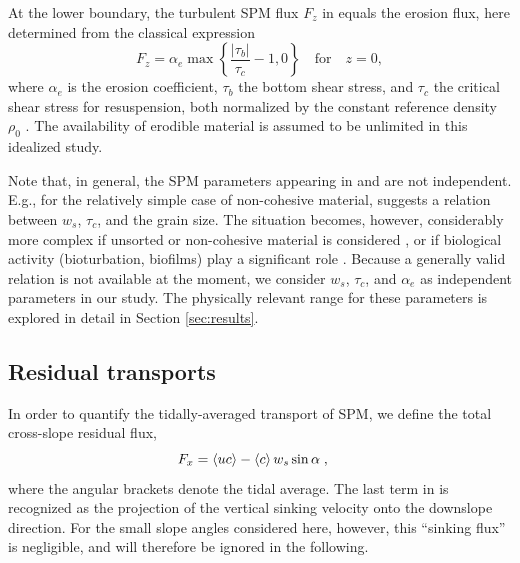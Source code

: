 At the lower boundary, the turbulent SPM flux $F_z$ in  equals
the erosion flux, here determined from the classical expression
\begin{equation}
  \label{defFz}
  F_z = \alpha_e \max \left\{ \frac{\left| \tau_b \right| }{\tau_c} -1 , 0 \right\}
  \quad \text{for} \quad z=0,
\end{equation}
where $\alpha_e$ is the erosion coefficient, $\tau_b$ the
bottom shear stress, and $\tau_c$ the critical shear stress for
resuspension, both normalized by the constant reference density
$\rho_0$ \citep[see][]{krone1962,sanford1997,amoudry2011}. The
availability of erodible material is assumed to be unlimited in this
idealized study.

Note that, in general, the SPM parameters appearing in  and
 are not independent. E.g., for the relatively simple case
of non-cohesive material, \cite{vanRijn84b} suggests a relation
between $w_s$, $\tau_c$, and the grain size. The situation becomes,
however, considerably more complex if unsorted or non-cohesive
material is considered \citep[e.g.,][]{dade1992,sassi2015}, or if
biological activity (bioturbation, biofilms) play a significant role
\citep[][]{grant1986b,grant1994}. Because a generally valid relation is
not available at the moment, we consider $w_s$, $\tau_c$, and
$\alpha_e$ as independent parameters in our study. The physically
relevant range for these parameters is explored in detail in Section
\ref{sec:results}.

\subsection{Residual transports}
In order to quantify the tidally-averaged transport of SPM, we define
the total cross-slope residual flux,
\begin{equation}
  \label{Fx}
  F_x  = \left\langle uc \right\rangle - \left\langle c \right\rangle w_s \sin \alpha \; , \quad
\end{equation}
where the angular brackets denote the tidal average. The last term in
 is recognized as the projection of the vertical sinking
velocity onto the downslope direction. For the small slope angles
considered here, however, this ``sinking flux'' is negligible, and
will therefore be ignored in the following.

